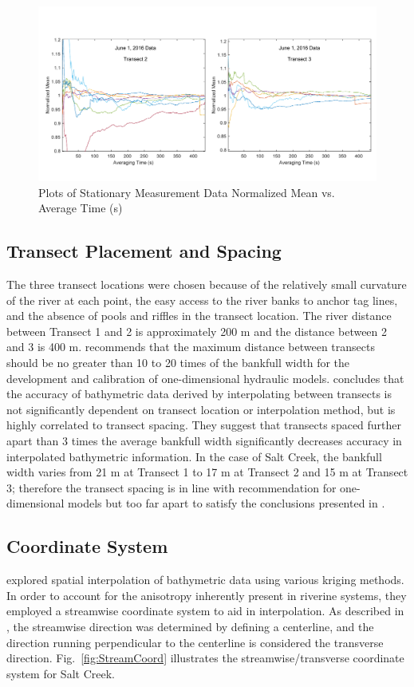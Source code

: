 \documentclass[Journal,letterpaper,BackFigs]{ascelike-new}
\begin{document}
\begin{figure}
\centering
\includegraphics[width=\textwidth]{Turbulence.pdf}
\caption{Plots of Stationary Measurement Data Normalized Mean vs. Average Time (s)}
\label{fig:Turbulence}
\end{figure}

\subsection{Transect Placement and Spacing}
The three transect locations were chosen because of the relatively small curvature of the river at each point, the easy access to the river banks to anchor tag lines, and the absence of pools and riffles in the transect location. The river distance between Transect 1 and 2 is approximately 200 m and the distance between 2 and 3 is 400 m.  recommends that the maximum distance between transects should be no greater than 10 to 20 times of the bankfull width for the development and calibration of one-dimensional hydraulic models.  concludes that the accuracy of bathymetric data derived by interpolating between transects is not significantly dependent on transect location or interpolation method, but is highly correlated to transect spacing. They suggest that transects spaced further apart than 3 times the average bankfull width significantly decreases accuracy in interpolated bathymetric information. In the case of Salt Creek, the bankfull width varies from 21 m at Transect 1 to 17 m at Transect 2 and 15 m at Transect 3; therefore the transect spacing is in line with  recommendation for one-dimensional models but too far apart to satisfy the conclusions presented in .

\subsection{Coordinate System}
 explored spatial interpolation of bathymetric data using various kriging methods. In order to account for the anisotropy inherently present in riverine systems, they employed a streamwise coordinate system to aid in interpolation. As described in , the streamwise direction was determined by defining a centerline, and the direction running perpendicular to the centerline is considered the transverse direction. Fig.~\ref{fig:StreamCoord} illustrates the streamwise/transverse coordinate system for Salt Creek. 
\end{document}
